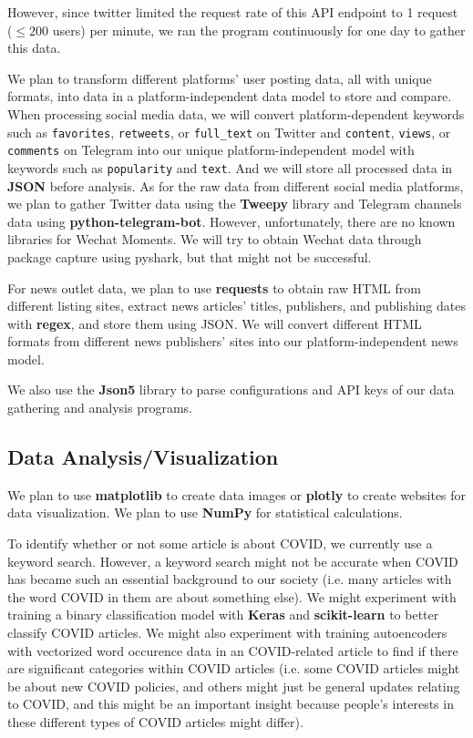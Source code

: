\documentclass{article}
\begin{document}
    However, since twitter limited the request rate of this API endpoint to 1 request ($\le 200$ users) per minute, we ran the program continuously for one day to gather this data.

    We plan to transform different platforms’ user posting data, all with unique formats, into data in a platform-independent data model to store and compare. When processing social media data, we will convert platform-dependent keywords such as \texttt{favorites}, \texttt{retweets}, or \texttt{full\_text} on Twitter and \texttt{content}, \texttt{views}, or \texttt{comments} on Telegram into our unique platform-independent model with keywords such as \texttt{popularity} and \texttt{text}. And we will store all processed data in \textbf{JSON} before analysis. As for the raw data from different social media platforms, we plan to gather Twitter data using the \textbf{Tweepy} library and Telegram channels data using \textbf{python-telegram-bot}. However, unfortunately, there are no known libraries for Wechat Moments. We will try to obtain Wechat data through package capture using pyshark, but that might not be successful.

    For news outlet data, we plan to use \textbf{requests} to obtain raw HTML from different listing sites, extract news articles’ titles, publishers, and publishing dates with \textbf{regex}, and store them using JSON. We will convert different HTML formats from different news publishers’ sites into our platform-independent news model.

    We also use the \textbf{Json5} library to parse configurations and API keys of our data gathering and analysis programs.

    \subsection*{Data Analysis/Visualization}
    \indent

    We plan to use \textbf{matplotlib} to create data images or \textbf{plotly} to create websites for data visualization. We plan to use \textbf{NumPy} for statistical calculations.

    To identify whether or not some article is about COVID, we currently use a keyword search. However, a keyword search might not be accurate when COVID has became such an essential background to our society (i.e. many articles with the word COVID in them are about something else). We might experiment with training a binary classification model with \textbf{Keras} and \textbf{scikit-learn} to better classify COVID articles. We might also experiment with training autoencoders with vectorized word occurence data in an COVID-related article to find if there are significant categories within COVID articles (i.e. some COVID articles might be about new COVID policies, and others might just be general updates relating to COVID, and this might be an important insight because people's interests in these different types of COVID articles might differ).
\end{document}
